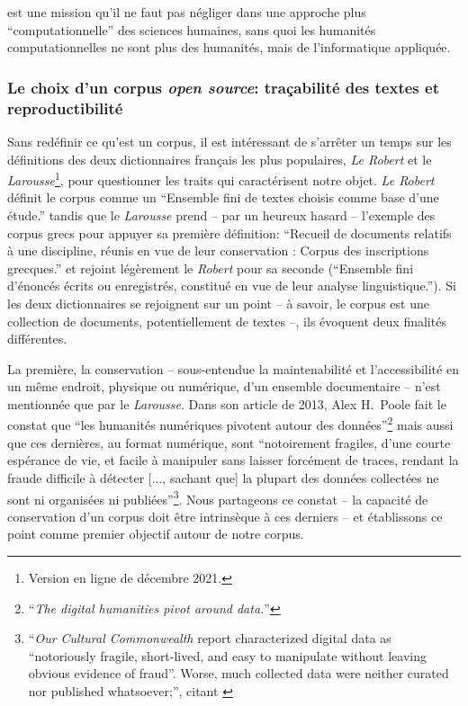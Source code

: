 est une mission qu'il ne faut pas négliger dans une approche plus ``computationnelle'' des sciences humaines, sans quoi les humanités computationnelles ne sont plus des humanités, mais de l'informatique appliquée.

\subsubsection{Le choix d’un corpus \textit{open source}: traçabilité des textes et reproductibilité}

Sans redéfinir ce qu'est un corpus, il est intéressant de s'arrêter un temps sur les définitions des deux dictionnaires français les plus populaires, \textit{Le Robert} et le \textit{Larousse}\footnote{Version en ligne de décembre 2021.}, pour questionner les traits qui caractérisent notre objet. \textit{Le Robert} définit le corpus comme un ``Ensemble fini de textes choisis comme base d'une étude.'' tandis que le \textit{Larousse} prend -- par un heureux hasard -- l'exemple des corpus grecs pour appuyer sa première définition: ``Recueil de documents relatifs à une discipline, réunis en vue de leur conservation : Corpus des inscriptions grecques.'' et rejoint légèrement le \textit{Robert} pour sa seconde (``Ensemble fini d'énoncés écrits ou enregistrés, constitué en vue de leur analyse linguistique.''). Si les deux dictionnaires se rejoignent sur un point --  à savoir, le corpus est une collection de documents, potentiellement de textes --, ils évoquent deux finalités différentes. 

La première, la conservation -- sous-entendue la maintenabilité et l'accessibilité en un même endroit, physique ou numérique, d'un ensemble documentaire -- n'est mentionnée que par le \textit{Larousse}. Dans son article de 2013, Alex H.~Poole fait le constat que ``les humanités numériques pivotent autour des données''\footnote{``\textit{The digital humanities pivot around data.}''\cite{poole_now_2013}} mais aussi que ces dernières, au format numérique, sont ``notoirement fragiles, d'une courte espérance de vie, et facile à manipuler sans laisser forcément de traces, rendant la fraude difficile à détecter [..., sachant que] la plupart des données collectées ne sont ni organisées ni publiées''\footnote{``\textit{Our Cultural Commonwealth} report characterized digital data as “notoriously fragile, short-lived, and easy to manipulate without leaving obvious evidence of fraud”. Worse, much collected data were neither curated nor published whatsoever;'', \cite{poole_now_2013} citant \cite{unsworth2006our}}. Nous partageons ce constat -- la capacité de conservation d'un corpus doit être intrinsèque à ces derniers -- et établissons ce point comme premier objectif autour de notre corpus. 

